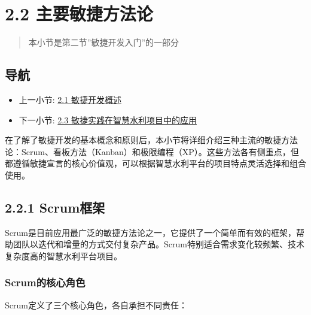 \section{2.2
主要敏捷方法论}\label{ux4e3bux8981ux654fux6377ux65b9ux6cd5ux8bba}

\begin{quote}
本小节是第二节''敏捷开发入门''的一部分
\end{quote}

\subsection{导航}\label{ux5bfcux822a}

\begin{itemize}
\tightlist
\item
  上一小节: \href{section03-02-01.md}{2.1 敏捷开发概述}
\item
  下一小节: \href{section03-02-03.md}{2.3
  敏捷实践在智慧水利项目中的应用}
\end{itemize}

在了解了敏捷开发的基本概念和原则后，本小节将详细介绍三种主流的敏捷方法论：Scrum、看板方法（Kanban）和极限编程（XP）。这些方法各有侧重点，但都遵循敏捷宣言的核心价值观，可以根据智慧水利平台的项目特点灵活选择和组合使用。

\subsection{2.2.1 Scrum框架}\label{scrumux6846ux67b6}

Scrum是目前应用最广泛的敏捷方法论之一，它提供了一个简单而有效的框架，帮助团队以迭代和增量的方式交付复杂产品。Scrum特别适合需求变化较频繁、技术复杂度高的智慧水利平台项目。

\subsubsection{Scrum的核心角色}\label{scrumux7684ux6838ux5fc3ux89d2ux8272}

Scrum定义了三个核心角色，各自承担不同责任：

